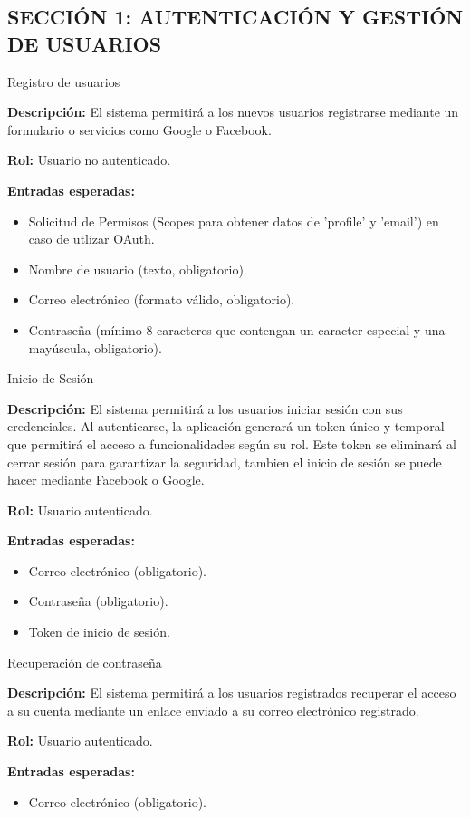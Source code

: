 \subsection*{\uppercase{Sección 1: Autenticación y Gestión de Usuarios}}
\begin{requisito}{Registro de usuarios}
	\item \textbf{Descripción:} El sistema permitirá a los nuevos usuarios registrarse mediante un formulario o servicios como Google o Facebook.
	\item \textbf{Rol:} Usuario no autenticado.
	\item \textbf{Entradas esperadas:}
	\begin{itemize}
		\item Solicitud de Permisos (Scopes para obtener datos de 'profile' y 'email') en caso de utlizar OAuth.
		\item Nombre de usuario (texto, obligatorio).
		\item Correo electrónico (formato válido, obligatorio).
		\item Contraseña (mínimo 8 caracteres que contengan un caracter especial y una mayúscula, obligatorio).
	\end{itemize}
\end{requisito}
\begin{requisito}{Inicio de Sesión}
	\item \textbf{Descripción:} El sistema permitirá a los usuarios iniciar sesión con sus credenciales. Al autenticarse, la aplicación generará un token único y temporal que permitirá el acceso a funcionalidades según su rol. Este token se eliminará al cerrar sesión para garantizar la seguridad, tambien el inicio de sesión se puede hacer mediante Facebook o Google.
	\item \textbf{Rol:} Usuario autenticado.
	\item \textbf{Entradas esperadas:}
	\begin{itemize}
		\item Correo electrónico (obligatorio).
		\item Contraseña (obligatorio).
		\item Token de inicio de sesión.
	\end{itemize}
\end{requisito}
\begin{requisito}{Recuperación de contraseña}
	\item \textbf{Descripción:} El sistema permitirá a los usuarios registrados recuperar el acceso a su cuenta mediante un enlace enviado a su correo electrónico registrado.
	\item \textbf{Rol:} Usuario autenticado.
	\item \textbf{Entradas esperadas:}
	\begin{itemize}
		\item Correo electrónico (obligatorio).
	\end{itemize}
\end{requisito}
